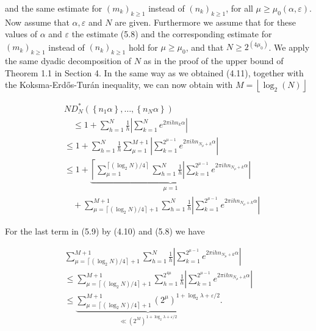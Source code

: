 \documentclass[10pt]{article}
\begin{document}
and the same estimate for $\left(m_{k}\right)_{k \geqslant 1}$ instead of $\left(n_{k}\right)_{k \geqslant 1}$, for all $\mu \geqslant \mu_{0}(\alpha, \varepsilon)$.\\
Now assume that $\alpha, \varepsilon$ and $N$ are given. Furthermore we assume that for these values of $\alpha$ and $\varepsilon$ the estimate (5.8) and the corresponding estimate for $\left(m_{k}\right)_{k \geqslant 1}$ instead of $\left(n_{k}\right)_{k \geqslant 1}$ hold for $\mu \geqslant \mu_{0}$, and that $N \geqslant 2^{\left(4 \mu_{0}\right)}$. We apply the same dyadic decomposition of $N$ as in the proof of the upper bound of Theorem 1.1 in Section 4. In the same way as we obtained (4.11), together with the Koksma-Erdős-Turán inequality, we can now obtain with $M=\left\lfloor\log _{2}(N)\right\rfloor$


\begin{align*}
& N D_{N}^{*}\left(\left\{n_{1} \alpha\right\}, \ldots,\left\{n_{N} \alpha\right\}\right)  \tag{5.9}\\
& \quad \leqslant 1+\sum_{h=1}^{N} \frac{1}{h}\left|\sum_{k=1}^{N} e^{2 \pi i h n_{k} \alpha}\right| \\
& \leqslant 1+\sum_{h=1}^{N} \frac{1}{h} \sum_{\mu=1}^{M+1}\left|\sum_{k=1}^{2^{\mu-1}} e^{2 \pi i h n_{N_{\mu}+k} \alpha}\right| \\
& \leqslant 1+\underbrace{\left\lceil\sum_{\mu=1}^{\left\lceil\left(\log _{2} N\right) / 4\right\rceil} \sum_{h=1}^{N} \frac{1}{h}\left|\sum_{k=1}^{2^{\mu-1}} e^{2 \pi i h n_{N_{\mu}+k} \alpha}\right|\right.}_{\mu=1} \\
& \quad+\sum_{\mu=\left\lceil\left(\log _{2} N\right) / 4\right\rceil+1}^{M+1} \sum_{h=1}^{N} \frac{1}{h}\left|\sum_{k=1}^{2^{\mu-1}} e^{2 \pi i h n_{N_{\mu}+k} \alpha}\right|
\end{align*}


For the last term in (5.9) by (4.10) and (5.8) we have

$$
\begin{gathered}
\sum_{\mu=\left\lceil\left(\log _{2} N\right) / 4\right\rceil+1}^{M+1} \sum_{h=1}^{N} \frac{1}{h}\left|\sum_{k=1}^{2^{\mu-1}} e^{2 \pi i h n_{N_{\mu}+k} \alpha}\right| \\
\leqslant \sum_{\mu=\left\lceil\left(\log _{2} N\right) / 4\right\rceil+1}^{M+1} \sum_{h=1}^{2^{4 \mu}} \frac{1}{h}\left|\sum_{k=1}^{2^{\mu-1}} e^{2 \pi i h n_{N_{\mu}+k} \alpha}\right| \\
\leqslant \underbrace{\sum_{\mu=\left\lceil\left(\log _{2} N\right) / 4\right\rceil+1}^{M+1}\left(2^{\mu}\right)^{1+\log _{2} \lambda+\varepsilon / 2}}_{\ll\left(2^{M}\right)^{1+\log _{2} \lambda+\varepsilon / 2}} .
\end{gathered}
$$
\end{document}
